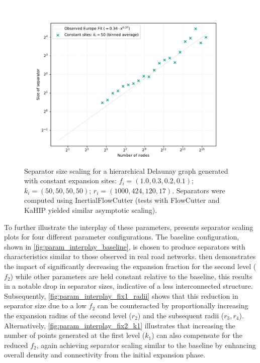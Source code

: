 \begin{figure}[tbhp]
	\centering
	\includegraphics[width=0.6\linewidth]{graphics/hierachcial_delaunay_const_sites.pdf}
	\caption{Separator size scaling for a hierarchical Delaunay graph generated with constant expansion sites: \(f_i=(1.0, 0.3, 0.2, 0.1)\); \(k_i=(50, 50, 50, 50)\); \(r_i=(1000, 424, 120, 17)\). Separators were computed using InertialFlowCutter (tests with FlowCutter and KaHIP yielded similar asymptotic scaling).}
	\label{fig:hier_delaunay_example_params_sep}
\end{figure}

To further illustrate the interplay of these parameters,  presents separator scaling plots for four different parameter configurations.
The baseline configuration, shown in \cref{fig:param_interplay_baseline}, is chosen to produce separators with characteristics similar to those observed in real road networks.
 then demonstrates the impact of significantly decreasing the expansion fraction for the second level (\(f_2\)) while other parameters are held constant relative to the baseline,
this results in a notable drop in separator sizes, indicative of a less interconnected structure.
Subsequently, \cref{fig:param_interplay_fix1_radii} shows that this reduction in separator size due to a low \(f_2\) can be counteracted by proportionally increasing the expansion radius of the second level (\(r_2\)) and the subsequent radii (\(r_3, r_4\)).
Alternatively, \cref{fig:param_interplay_fix2_k1} illustrates that increasing the number of points generated at the first level (\(k_1\)) can also compensate for the reduced \(f_2\), again achieving separator scaling similar to the baseline by enhancing overall density and connectivity from the initial expansion phase.

